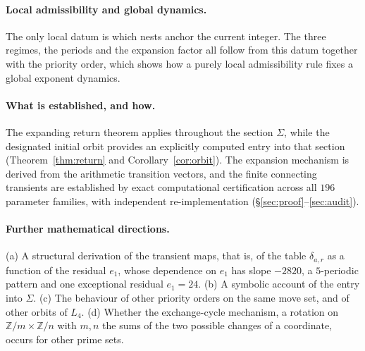 \documentclass[11pt,a4paper]{article}
\theoremstyle{definition}
\newcommand{\Sig}{\Sigma}
\begin{document}
\paragraph{Local admissibility and global dynamics.} The only local datum is which nests anchor the current integer. The three regimes, the periods and the expansion factor all follow from this datum together with the priority order, which shows how a purely local admissibility rule fixes a global exponent dynamics.

\paragraph{What is established, and how.} The expanding return theorem applies throughout the section $\Sig$, while the designated initial orbit provides an explicitly computed entry into that section (Theorem~\ref{thm:return} and Corollary~\ref{cor:orbit}). The expansion mechanism is derived from the arithmetic transition vectors, and the finite connecting transients are established by exact computational certification across all $196$ parameter families, with independent re-implementation (\S\ref{sec:proof}--\ref{sec:audit}).

\paragraph{Further mathematical directions.} (a) A structural derivation of the transient maps, that is, of the table $\delta_{a,r}$ as a function of the residual $e_1$, whose dependence on $e_1$ has slope $-2820$, a $5$-periodic pattern and one exceptional residual $e_1=24$. (b) A symbolic account of the entry into $\Sig$. (c) The behaviour of other priority orders on the same move set, and of other orbits of $L_4$. (d) Whether the exchange-cycle mechanism, a rotation on $\mathbb{Z}/m\times\mathbb{Z}/n$ with $m,n$ the sums of the two possible changes of a coordinate, occurs for other prime sets.
\end{document}
